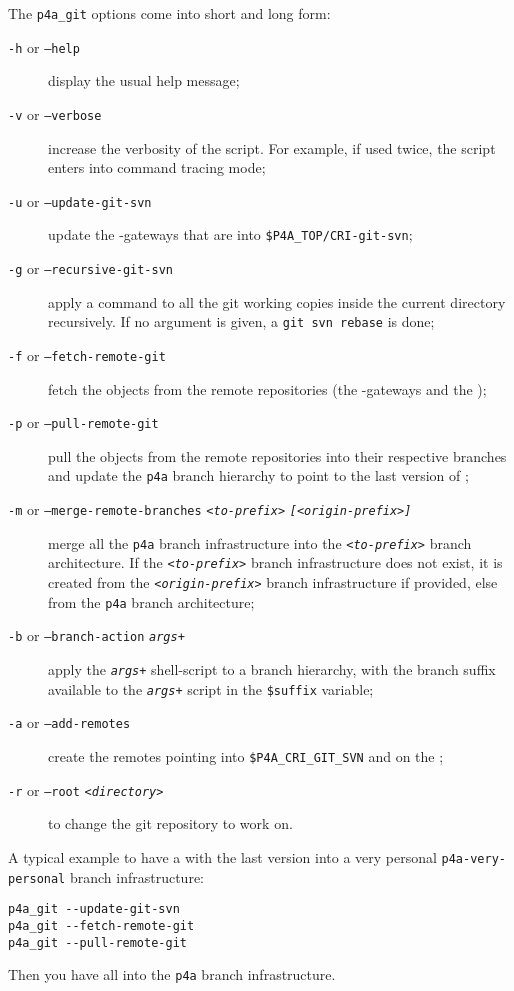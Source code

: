 \documentclass[a4paper]{article}
\begin{document}
The \verb|p4a_git| options come into short and long form:
\begin{description}
\item[\texttt{-h} or \texttt{--help}] display the usual help message;
\item[\texttt{-v} or \texttt{--verbose}] increase the verbosity of the
  script. For example, if used twice, the script enters into command
  tracing mode;
\item[\texttt{-u} or \texttt{--update-git-svn}] update the \Apips{}
  \Agit-\Asvn gateways that are into \verb|$P4A_TOP/CRI-git-svn|;%
\item[\texttt{-g} or \texttt{--recursive-git-svn}] apply a \Agit command
  to all the git working copies inside the current directory
  recursively. If no argument is given, a \texttt{git svn rebase} is done;
\item[\texttt{-f} or \texttt{--fetch-remote-git}] fetch the objects from
  the remote \Agit repositories (the \Apips{} \Agit-\Asvn gateways and the
  \Apolylib{} \Agit);
\item[\texttt{-p} or \texttt{--pull-remote-git}] pull the objects from the
  remote \Agit repositories into their respective branches and update the
  \texttt{p4a} branch hierarchy to point to the last version of \Apfa;
\item[\texttt{-m} or \texttt{--merge-remote-branches}
  \texttt{\emph{<to-prefix>}} \texttt{\emph{[<origin-prefix>]}}] merge all
  the \texttt{p4a} branch infrastructure into the
  \texttt{\emph{<to-prefix>}} branch architecture. If the
  \texttt{\emph{<to-prefix>}} branch infrastructure does not exist, it is
  created from the \texttt{\emph{<origin-prefix>}} branch infrastructure
  if provided, else from the \texttt{p4a} branch architecture;
\item[\texttt{-b} or \texttt{--branch-action} \texttt{\emph{args+}}] apply
  the \texttt{\emph{args+}} shell-script to a branch hierarchy, with the
  branch suffix available to the \texttt{\emph{args+}} script in the
  \verb|$suffix| variable;
\item[\texttt{-a} or \texttt{--add-remotes}] create the remotes pointing
  into \verb|$P4A_CRI_GIT_SVN| and on the \Apolylib{} \Agit;
\item[\texttt{-r} or \texttt{--root} \texttt{<\emph{directory}>}] to
  change the git repository to work on.
\end{description}

A typical example to have a \Apfa with the last \Apips version into a very
personal \verb|p4a-very-personal| branch infrastructure:
\begin{verbatim}
p4a_git --update-git-svn
p4a_git --fetch-remote-git
p4a_git --pull-remote-git
\end{verbatim}
Then you have all \Apfa into the \verb|p4a| branch infrastructure.
\end{document}
